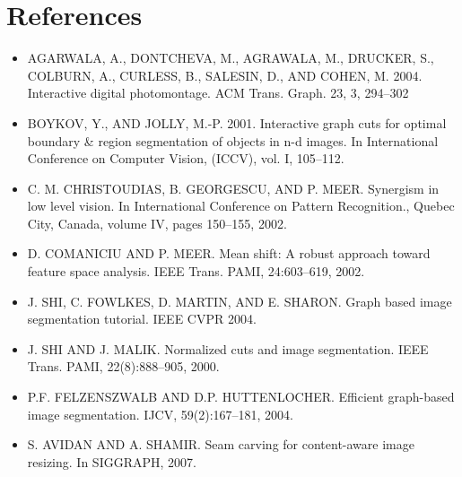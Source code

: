 \documentclass[12pt]{article}
\begin{document}
\section{References}

\begin{itemize}
    \item AGARWALA, A., DONTCHEVA, M., AGRAWALA, M., DRUCKER, S., COLBURN, A., CURLESS, B., SALESIN, D., AND COHEN, M. 2004. Interactive digital photomontage. ACM Trans. Graph. 23, 3, 294–302
    
    \item BOYKOV, Y., AND JOLLY, M.-P. 2001. Interactive graph cuts for optimal boundary \& region segmentation of objects in n-d images. In International Conference on Computer Vision, (ICCV), vol. I, 105–112.
    
    \item C. M. CHRISTOUDIAS, B. GEORGESCU, AND P. MEER. Synergism in low level vision. In International Conference on Pattern Recognition., Quebec City, Canada, volume IV, pages 150–155, 2002.
    
    \item D. COMANICIU AND P. MEER. Mean shift: A robust approach toward feature space analysis. IEEE Trans. PAMI, 24:603–619, 2002.
    
    \item J. SHI, C. FOWLKES, D. MARTIN, AND E. SHARON. Graph based image segmentation tutorial. IEEE CVPR 2004.
    
    \item J. SHI AND J. MALIK. Normalized cuts and image segmentation. IEEE Trans. PAMI, 22(8):888–905, 2000.
    
    \item P.F. FELZENSZWALB AND D.P. HUTTENLOCHER. Efficient graph-based image segmentation. IJCV, 59(2):167–181, 2004.
    
    \item S. AVIDAN AND A. SHAMIR. Seam carving for content-aware image resizing. In
SIGGRAPH, 2007.
    

\end{itemize}

\end{document}
